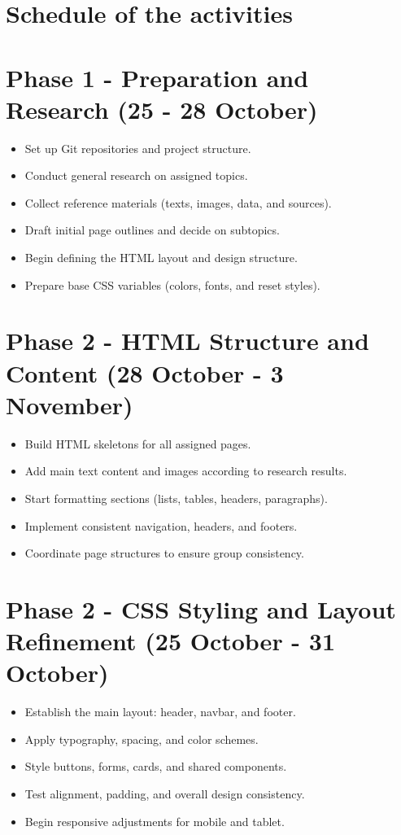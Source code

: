 \documentclass[a4paper,12pt]{article}
\begin{document}
\section*{Schedule of the activities}

\section{Phase 1 - Preparation and Research (25 - 28 October)}
\begin{itemize}[leftmargin=1.2cm]
    \item Set up Git repositories and project structure.
    \item Conduct general research on assigned topics.
    \item Collect reference materials (texts, images, data, and sources).
    \item Draft initial page outlines and decide on subtopics.
    \item Begin defining the HTML layout and design structure.
    \item Prepare base CSS variables (colors, fonts, and reset styles).
\end{itemize}

\section{Phase 2 - {\LARGE HTML} Structure and Content (28 October - 3 November)}
\begin{itemize}[leftmargin=1.2cm]
    \item Build HTML skeletons for all assigned pages.
    \item Add main text content and images according to research results.
    \item Start formatting sections (lists, tables, headers, paragraphs).
    \item Implement consistent navigation, headers, and footers.
    \item Coordinate page structures to ensure group consistency.
\end{itemize}

\section{Phase 2 - {\LARGE CSS} Styling and Layout Refinement (25 October - 31 October)}
\begin{itemize}[leftmargin=1.2cm]
    \item Establish the main layout: header, navbar, and footer.
    \item Apply typography, spacing, and color schemes.
    \item Style buttons, forms, cards, and shared components.
    \item Test alignment, padding, and overall design consistency.
    \item Begin responsive adjustments for mobile and tablet.
\end{itemize}
\end{document}
